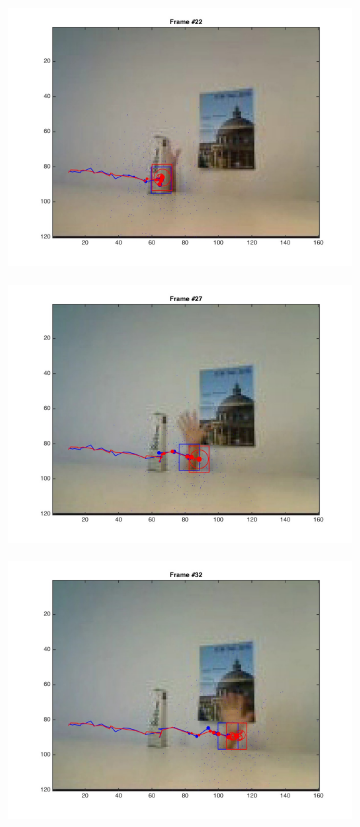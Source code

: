 \documentclass{ethz_report}
\begin{document}
\begin{figure}[h]
\begin{subfigure}[b]{.25\textwidth}
        \includegraphics[width=1\linewidth]{images/video2__21}
    \end{subfigure}%
    \begin{subfigure}[b]{.25\textwidth}
        \centering
        \includegraphics[width=1\linewidth]{images/video2__26}
    \end{subfigure}%
    \begin{subfigure}[b]{.25\textwidth}
        \centering
        \includegraphics[width=1\linewidth]{images/video2__31}

\end{subfigure}
\end{figure}
\end{document}
